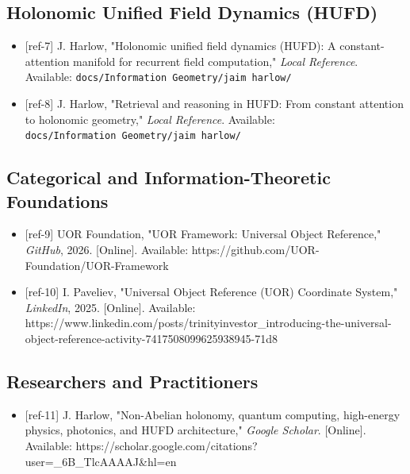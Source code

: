 \documentclass[12pt,a4paper]{article}
\providecommand{\tightlist}{\setlength{\itemsep}{0pt}\setlength{\parskip}{0pt}}
\begin{document}
\subsection{Holonomic Unified Field Dynamics
(HUFD)}\label{holonomic-unified-field-dynamics-hufd}

\begin{itemize}
\tightlist
\item
  {[}ref-7{]} J. Harlow, "Holonomic unified field dynamics (HUFD): A
  constant-attention manifold for recurrent field computation,"
  \emph{Local Reference}. Available:
  \texttt{docs/Information\ Geometry/jaim\ harlow/}
\item
  {[}ref-8{]} J. Harlow, "Retrieval and reasoning in HUFD: From constant
  attention to holonomic geometry," \emph{Local Reference}. Available:
  \texttt{docs/Information\ Geometry/jaim\ harlow/}
\end{itemize}

\subsection{Categorical and Information-Theoretic
Foundations}\label{categorical-and-information-theoretic-foundations}

\begin{itemize}
\tightlist
\item
  {[}ref-9{]} UOR Foundation, "UOR Framework: Universal Object
  Reference," \emph{GitHub}, 2026. {[}Online{]}. Available:
  https://github.com/UOR-Foundation/UOR-Framework
\item
  {[}ref-10{]} I. Paveliev, "Universal Object Reference (UOR) Coordinate
  System," \emph{LinkedIn}, 2025. {[}Online{]}. Available:
  https://www.linkedin.com/posts/trinityinvestor\_introducing-the-universal-object-reference-activity-7417508099625938945-71d8
\end{itemize}

\subsection{Researchers and
Practitioners}\label{researchers-and-practitioners}

\begin{itemize}
\tightlist
\item
  {[}ref-11{]} J. Harlow, "Non-Abelian holonomy, quantum computing,
  high-energy physics, photonics, and HUFD architecture," \emph{Google
  Scholar}. {[}Online{]}. Available:
  https://scholar.google.com/citations?user=\_6B\_TlcAAAAJ\&hl=en
\end{itemize}
\end{document}
